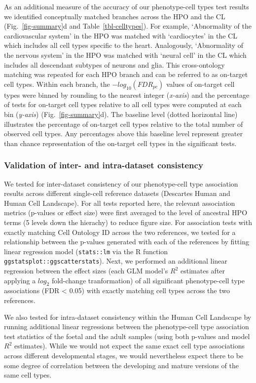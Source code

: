 \documentclass[
]{article}
\begin{document}
As an additional measure of the accuracy of our phenotype-cell types
test results we identified conceptually matched branches across the HPO
and the CL (Fig.~\ref{fig-summary}d and Table~\ref{tbl-celltypes}). For
example, `Abnormality of the cardiovascular system' in the HPO was
matched with `cardiocytes' in the CL which includes all cell types
specific to the heart. Analogously, `Abnormality of the nervous system'
in the HPO was matched with `neural cell' in the CL which includes all
descendant subtypes of neurons and glia. This cross-ontology matching
was repeated for each HPO branch and can be referred to as on-target
cell types. Within each branch, the \(-log_{10}(FDR _{pc})\) values of
on-target cell types were binned by rounding to the nearest integer
(\emph{x-axis}) and the percentage of tests for on-target cell types
relative to all cell types were computed at each bin (\emph{y-axis})
(Fig.~\ref{fig-summary}d). The baseline level (dotted horizontal line)
illustrates the percentage of on-target cell types relative to the total
number of observed cell types. Any percentages above this baseline level
represent greater than chance representation of the on-target cell types
in the significant tests.

\subsubsection{Validation of inter- and intra-dataset
consistency}\label{validation-of-inter--and-intra-dataset-consistency-1}

We tested for inter-dataset consistency of our phenotype-cell type
association results across different single-cell reference datasets
(Descartes Human and Human Cell Landscape). For all tests reported here,
the relevant association metrics (p-values or effect size) were first
averaged to the level of ancestral HPO terms (5 levels down the
hierachy) to reduce figure size. For association tests with exactly
matching Cell Ontology ID across the two references, we tested for a
relationship between the p-values generated with each of the references
by fitting linear regression model (\texttt{stats::lm} via the R
function \texttt{ggstatsplot::ggscatterstats}). Next, we performed an
additional linear regression between the effect sizes (each GLM model's
\(R^2\) estimates after applying a \(log_2\) fold-change tranformation)
of all significant phenotype-cell type associations (FDR \textless{}
0.05) with exactly matching cell types across the two references.

We also tested for intra-dataset consistency within the Human Cell
Landscape by running additional linear regressions between the
phenotype-cell type association test statistics of the foetal and the
adult samples (using both p-values and model \(R^2\) estimates). While
we would not expect the same exact cell type associations across
different developmental stages, we would nevertheless expect there to be
some degree of correlation between the developing and mature versions of
the same cell types.
\end{document}

